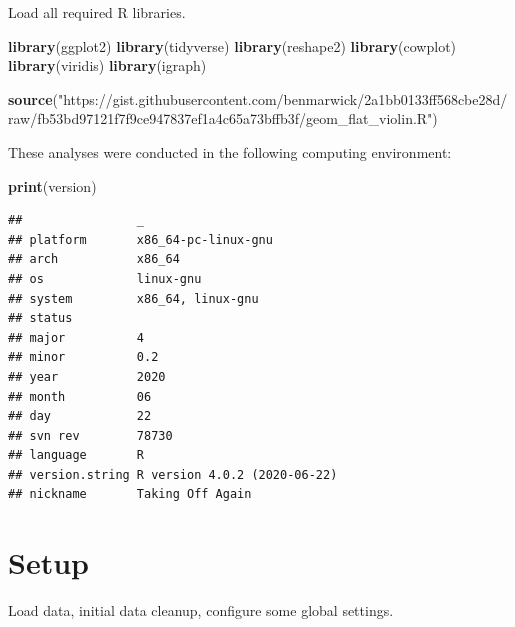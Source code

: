 \documentclass[
]{book}
\newenvironment{Shaded}{\begin{snugshade}}{\end{snugshade}}
\newcommand{\KeywordTok}[1]{\textcolor[rgb]{0.13,0.29,0.53}{\textbf{#1}}}
\newcommand{\NormalTok}[1]{#1}
\newcommand{\StringTok}[1]{\textcolor[rgb]{0.31,0.60,0.02}{#1}}
\begin{document}
Load all required R libraries.

\begin{Shaded}
\begin{Highlighting}[]
\KeywordTok{library}\NormalTok{(ggplot2)}
\KeywordTok{library}\NormalTok{(tidyverse)}
\KeywordTok{library}\NormalTok{(reshape2)}
\KeywordTok{library}\NormalTok{(cowplot)}
\KeywordTok{library}\NormalTok{(viridis)}
\KeywordTok{library}\NormalTok{(igraph)}

\KeywordTok{source}\NormalTok{(}\StringTok{"https://gist.githubusercontent.com/benmarwick/2a1bb0133ff568cbe28d/raw/fb53bd97121f7f9ce947837ef1a4c65a73bffb3f/geom\_flat\_violin.R"}\NormalTok{)}
\end{Highlighting}
\end{Shaded}

These analyses were conducted in the following computing environment:

\begin{Shaded}
\begin{Highlighting}[]
\KeywordTok{print}\NormalTok{(version)}
\end{Highlighting}
\end{Shaded}

\begin{verbatim}
##                _                           
## platform       x86_64-pc-linux-gnu         
## arch           x86_64                      
## os             linux-gnu                   
## system         x86_64, linux-gnu           
## status                                     
## major          4                           
## minor          0.2                         
## year           2020                        
## month          06                          
## day            22                          
## svn rev        78730                       
## language       R                           
## version.string R version 4.0.2 (2020-06-22)
## nickname       Taking Off Again
\end{verbatim}

\hypertarget{setup-1}{%
\section{Setup}\label{setup-1}}

Load data, initial data cleanup, configure some global settings.
\end{document}
